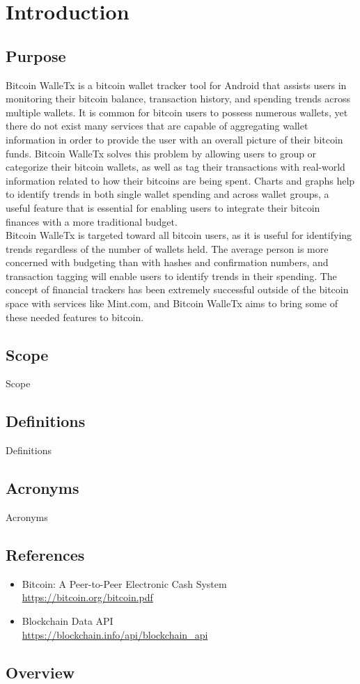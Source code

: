 \section{Introduction}
  \subsection{Purpose}
  Bitcoin WalleTx is a bitcoin wallet tracker tool for Android that assists users in monitoring their bitcoin balance, transaction history, and spending trends across multiple wallets. It is common for bitcoin users to possess numerous wallets, yet there do not exist many services that are capable of aggregating wallet information in order to provide the user with an overall picture of their bitcoin funds. Bitcoin WalleTx solves this problem by allowing users to group or categorize their bitcoin wallets, as well as tag their transactions with real-world information related to how their bitcoins are being spent. Charts and graphs help to identify trends in both single wallet spending and across wallet groups, a useful feature that is essential for enabling users to integrate their bitcoin finances with a more traditional budget.\\

  Bitcoin WalleTx is targeted toward all bitcoin users, as it is useful for identifying trends regardless of the number of wallets held. The average person is more concerned with budgeting than with hashes and confirmation numbers, and transaction tagging will enable users to identify trends in their spending. The concept of financial trackers has been extremely successful outside of the bitcoin space with services like Mint.com, and Bitcoin WalleTx aims to bring some of these needed features to bitcoin.\\

  \subsection{Scope}
  Scope 
  \subsection{Definitions}
  Definitions
  \subsection{Acronyms}
  Acronyms
  \subsection{References}
  \begin{itemize}
    \item Bitcoin: A Peer-to-Peer Electronic Cash System\\ \url{https://bitcoin.org/bitcoin.pdf}
    \item Blockchain Data API\\ \url{https://blockchain.info/api/blockchain_api}
  \end{itemize}
  \subsection{Overview}
